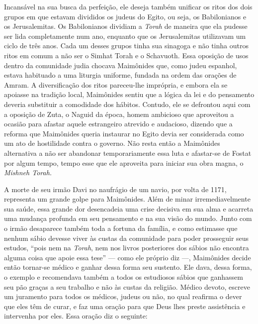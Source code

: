 Incansável na sua busca da perfeição, ele deseja também unificar os
ritos dos dois grupos em que estavam divididos os judeus do Egito, ou
seja, os Babilonianos e os Jerusalemitas. Os Babilonianos dividiam a
\emph{Torah} de maneira que ela pudesse ser lida completamente num ano,
enquanto que os Jerusalemitas utilizavam um ciclo de três anos. Cada um
desses grupos tinha sua sinagoga e não tinha outros ritos em comum a
não ser o Simhat Torah e o Schavuoth. Essa oposição de usos dentro da
comunidade judia chocava Maimônides que, como judeu espanhol, estava
habituado a uma liturgia uniforme, fundada na ordem das orações de
Amram. A diversificação dos ritos pareceu-lhe imprópria, e embora ela se
apoiasse na tradição local, Maimônides sentiu que a lógica da lei e do
pensamento deveria substituir a comodidade dos hábitos. Contudo, ele se
defrontou aqui com a oposição de Zuta, o Naguid da época, homem
ambicioso que aproveitou a ocasião para afastar aquele estrangeiro
atrevido e audacioso, dizendo que a reforma que Maimônides queria
instaurar no Egito devia ser considerada como um ato de hostilidade
contra o governo. Não resta então a Maimônides alternativa a não ser
abandonar temporariamente essa luta e afastar-se de Fostat por algum
tempo, tempo esse que ele aproveita para iniciar sua obra magna, o
\emph{Mishneh Torah.}

A morte de seu irmão Davi no naufrágio de um navio, por volta de 1171,
representa um grande golpe para Maimônides. Além de minar
irremediavelmente sua saúde, essa grande dor desencadeia uma crise
decisiva em sua alma e acarreta uma mudança profunda em seu pensamento
e na sua visão do mundo. Junto com o irmão desaparece também
toda a fortuna da família, e
como estimasse que nenhum sábio devesse viver às custas da comunidade
para poder prosseguir seus estudos, ``pois nem na \emph{Torah}, nem nos
livros posteriores dos sábios não encontra alguma coisa que apoie essa
tese'' --- como ele próprio diz ---, Maimônides decide então tornar-se
médico e ganhar dessa forma seu sustento. Ele dava, dessa forma, o
exemplo e recomendava também a todos os estudiosos sábios que ganhassem
seu pão graças a seu trabalho e não às custas da religião. Médico
devoto, escreve um juramento para todos os médicos, judeus ou não, no
qual reafirma o dever que eles têm de curar, e faz uma oração para que
Deus lhes preste assistência e intervenha por eles. Essa oração diz o
seguinte:

